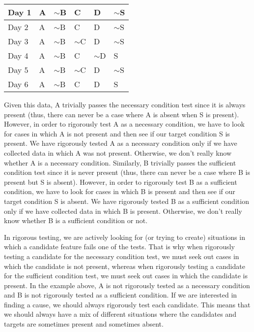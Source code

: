 \begin{table}[htp]
\begin{tabular}{|l|l|l|l|l|l|}
\hline
Day 1 & A & $\sim$B & C       & D       & $\sim$S \\
\hline
Day 2 & A & $\sim$B & C       & D       & $\sim$S \\
\hline
Day 3 & A & $\sim$B & $\sim$C & D       & $\sim$S \\
\hline
Day 4 & A & $\sim$B & C       & $\sim$D & S       \\
\hline
Day 5 & A & $\sim$B & $\sim$C & D       & $\sim$S \\
\hline
Day 6 & A & $\sim$B & C       & D       & S      \\
\hline
\end{tabular}
\end{table}


Given this data, A trivially passes the necessary condition test since it is always
present (thus, there can never be a case where A is absent when S is present).
However, in order to rigorously test A as a necessary condition, we have to look
for cases in which A is not present and then see if our target condition S is
present. We have rigorously tested A as a necessary condition only if we have
collected data in which A was not present. Otherwise, we don't really know
whether A is a necessary condition. Similarly, B trivially passes the sufficient
condition test since it is never present (thus, there can never be a case where B
is present but S is absent). However, in order to rigorously test B as a sufficient
condition, we have to look for cases in which B is present and then see if our
target condition S is absent. We have rigorously tested B as a sufficient
condition only if we have collected data in which B is present. Otherwise, we
don't really know whether B is a sufficient condition or not.

In rigorous testing, we are actively looking for (or trying to create) situations in
which a candidate feature fails one of the tests. That is why when rigorously
testing a candidate for the necessary condition test, we must seek out cases in
which the candidate is not present, whereas when rigorously testing a candidate
for the sufficient condition test, we must seek out cases in which the candidate is
present. In the example above, A is not rigorously tested as a necessary
condition and B is not rigorously tested as a sufficient condition. If we are
interested in finding a cause, we should always rigorously test each candidate.
This means that we should always have a mix of different situations where the
candidates and targets are sometimes present and sometimes absent. \\

